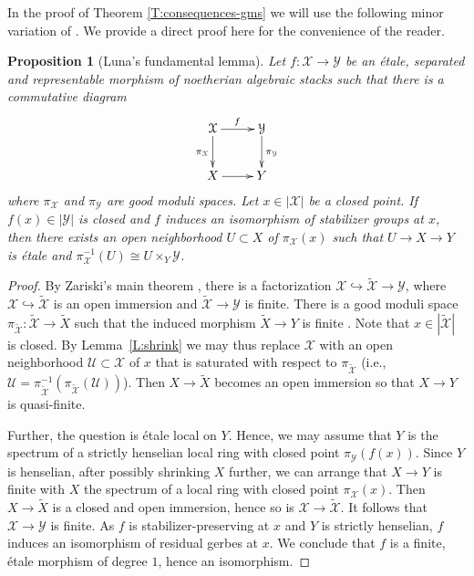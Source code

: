 \documentclass[a4paper]{amsart}
\theoremstyle{plain}
\newtheorem{proposition}[theorem]{Proposition}
\theoremstyle{definition}
\theoremstyle{remark}
\numberwithin{equation}{section}
\newcommand\cU{\mathcal{U}}
\newcommand\cX{\mathcal{X}}
\newcommand\cY{\mathcal{Y}}
\newcommand\co{\colon}
\begin{document}
In the proof of Theorem \ref{T:consequences-gms} we will use the following minor variation of \cite[Thm.~6.10]{alper-quotient}.  We provide a direct proof here for the convenience of the reader.
\begin{proposition}[Luna's fundamental lemma] \label{P:luna}
Let $f \co \cX \to \cY$ be an \'etale, separated and representable morphism of noetherian algebraic stacks such that there is a commutative diagram
$$\xymatrix{
\cX \ar[r]^f \ar[d]_{\pi_{\cX}}		& \cY \ar[d]^{\pi_{\cY}} \\
X \ar[r]						& Y
}$$
where $\pi_{\cX}$ and $\pi_{\cY}$ are good moduli spaces. Let $x \in |\cX|$ be a closed point.  If $f(x) \in |\cY|$ is closed and $f$ induces an isomorphism of stabilizer groups at $x$, then there exists an open neighborhood $U \subset X$ of $\pi_{\cX}(x)$ such that $U \to X \to Y$ is \'etale and $\pi_{\cX}^{-1}(U) \cong U \times_Y \cY$.
\end{proposition}

\begin{proof}
By Zariski's main theorem \cite[Cor.~16.4(ii)]{MR1771927}, there is a factorization $\cX \hookrightarrow \widetilde{\cX} \to \cY$, where $\cX \hookrightarrow \widetilde{\cX}$ is an open immersion and $\widetilde{\cX} \to \cY$ is finite. There is a good moduli space $\pi_{\widetilde{\cX}} \co \widetilde{\cX} \to \widetilde{X}$ such that the induced morphism $\widetilde{X}\to Y$ is finite \cite[Thm.\ 4.16(x)]{alper-good}. Note that $x\in |\widetilde{\cX}|$ is closed. By Lemma~\ref{L:shrink} we may thus replace $\cX$ with an open neighborhood $\cU \subset \cX$ of $x$ that is saturated with respect to $\pi_{\widetilde{\cX}}$ (i.e., $\cU =  \pi_{\widetilde{\cX}}^{-1}(\pi_{\widetilde{\cX}}(\cU))$). Then $X\to \widetilde{X}$ becomes an open immersion so that $X\to Y$ is quasi-finite.

Further, the question is \'etale local on $Y$. Hence, we may assume that $Y$ is the spectrum of a strictly henselian local ring with closed point $\pi_{\cY}(f(x))$.   Since $Y$ is henselian, after possibly shrinking $X$ further, we can arrange that $X \to Y$ is finite with $X$ the spectrum of a local ring with closed point $\pi_{\cX}(x)$. Then $X\to \widetilde{X}$ is a closed and open immersion, hence so is $\cX\to \widetilde{\cX}$. It follows that $\cX\to \cY$ is finite.
As $f$ is stabilizer-preserving at $x$ and $Y$ is strictly henselian, $f$ induces an isomorphism of residual gerbes at $x$.  We conclude that $f$ is a finite, \'etale morphism of degree $1$, hence an isomorphism.
\end{proof}
\end{document}
